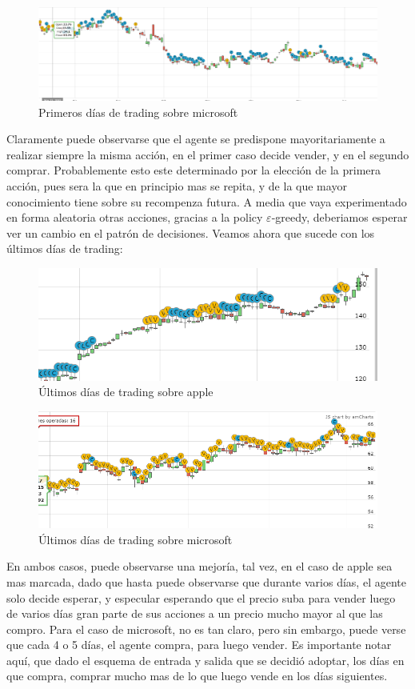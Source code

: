 \begin{figure}[h!]
	\includegraphics[scale=0.45]{imagenes/moe_msft_ex1_1.png}
	\caption{Primeros días de trading sobre microsoft}
\end{figure}

Claramente puede observarse que el agente se predispone mayoritariamente a realizar siempre la misma acción, en el primer caso decide vender, y en el segundo comprar.
Probablemente esto este determinado por la elección de la primera acción, pues sera la que en principio mas se repita, y de la que mayor conocimiento tiene sobre su recompenza futura. A media que vaya experimentado en forma aleatoria otras acciones, gracias a la policy $\varepsilon$-greedy, deberiamos esperar ver un cambio en el patrón de decisiones.
Veamos ahora que sucede con los últimos días de trading:

\begin{figure}[h!]
	\includegraphics[scale=0.7]{imagenes/moe_appl_ex1_2.png}
	\caption{Últimos días de trading sobre apple}
\end{figure}

\begin{figure}[h!]
	\includegraphics[scale=0.7]{imagenes/moe_msft_ex1_2.png}
	\caption{Últimos días de trading sobre microsoft}
\end{figure}

En ambos casos, puede observarse una mejoría, tal vez, en el caso de apple sea mas marcada, dado que hasta puede observarse que durante varios días, el agente solo decide esperar, y especular esperando que el precio suba para vender luego de varios días gran parte de sus acciones a un precio mucho mayor al que las compro.
Para el caso de microsoft, no es tan claro, pero sin embargo, puede verse que cada 4 o  5 días, el agente compra, para luego vender. Es importante notar aquí, que dado el esquema de entrada y salida que se decidió adoptar, los días en que compra, comprar mucho mas de lo que luego vende en los días siguientes.
